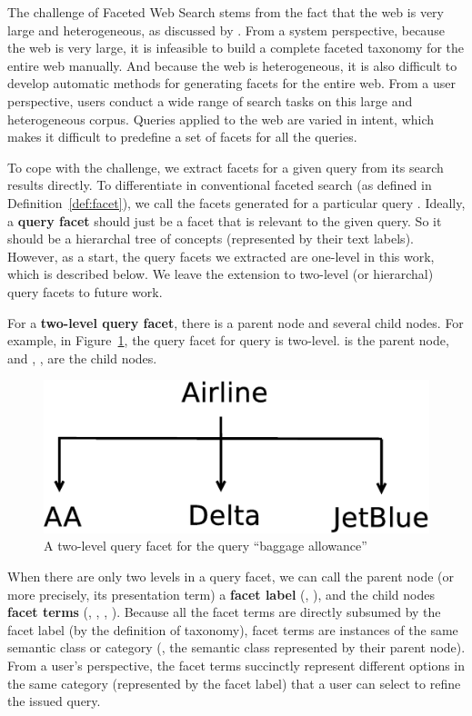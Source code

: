 The challenge of Faceted Web Search stems from the fact that the web is very large and heterogeneous, as discussed by \citet{teevan2008challenges}. From a system perspective, because the web is very large, it is infeasible to build a complete faceted taxonomy for the entire web manually. And because the web is heterogeneous, it is also difficult to develop automatic methods for generating facets for the entire web. From a user perspective, users conduct a wide range of search tasks on this large and heterogeneous corpus. Queries applied to the web are varied in intent, which makes it difficult to predefine a set of facets for all the queries. 

To cope with the challenge, we extract facets for a given query from its search results directly. To differentiate  in conventional faceted search (as defined in Definition~\ref{def:facet}), we call the facets generated for a particular query . Ideally, a \textbf{query facet} should just be a facet that is relevant to the given query. So it should be a hierarchal tree of concepts (represented by their text labels). However, as a start, the query facets we extracted are one-level in this work, which is described below. We leave the extension to two-level (or hierarchal) query facets to future work.

For a \textbf{two-level query facet}, there is a parent node and several child nodes. For example, in Figure~\ref{fig:bg-2level}, the query facet  for query  is two-level.  is the parent node, and  , ,  are the child nodes. 
\begin{figure}[!ht]
\centering
\includegraphics[width=0.35\columnwidth]{drawing/two-level.eps}
\caption{A two-level query facet for the query ``baggage allowance''}
\label{fig:bg-2level}
\end{figure}
When there are only two levels in a query facet, we can call the parent node (or more precisely, its presentation term) a \textbf{facet label} (\eg, ), and the child nodes \textbf{facet terms} (\eg, , , ). 
Because all the facet terms are directly subsumed by the facet label (by the definition of taxonomy), facet terms are instances of the same semantic class or category (\ie, the semantic class represented by their parent node). From a user's perspective, the facet terms succinctly represent different options in the same category (represented by the facet label) that a user can select to refine the issued query.

